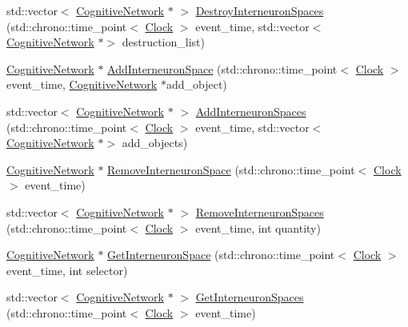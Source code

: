 \begin{DoxyCompactItemize}
\item 
std\+::vector$<$ \mbox{\hyperlink{class_cognitive_network}{Cognitive\+Network}} $\ast$ $>$ \mbox{\hyperlink{class_cognitive_network_a718833496332e0471186c9a886005c4a}{Destroy\+Interneuron\+Spaces}} (std\+::chrono\+::time\+\_\+point$<$ \mbox{\hyperlink{universe_8h_a0ef8d951d1ca5ab3cfaf7ab4c7a6fd80}{Clock}} $>$ event\+\_\+time, std\+::vector$<$ \mbox{\hyperlink{class_cognitive_network}{Cognitive\+Network}} $\ast$$>$ destruction\+\_\+list)
\item 
\mbox{\hyperlink{class_cognitive_network}{Cognitive\+Network}} $\ast$ \mbox{\hyperlink{class_cognitive_network_ac6a7e01f097d0cb6434eb8fa7640c214}{Add\+Interneuron\+Space}} (std\+::chrono\+::time\+\_\+point$<$ \mbox{\hyperlink{universe_8h_a0ef8d951d1ca5ab3cfaf7ab4c7a6fd80}{Clock}} $>$ event\+\_\+time, \mbox{\hyperlink{class_cognitive_network}{Cognitive\+Network}} $\ast$add\+\_\+object)
\item 
std\+::vector$<$ \mbox{\hyperlink{class_cognitive_network}{Cognitive\+Network}} $\ast$ $>$ \mbox{\hyperlink{class_cognitive_network_aeafe16b9f44ae1316c072a85e726ee83}{Add\+Interneuron\+Spaces}} (std\+::chrono\+::time\+\_\+point$<$ \mbox{\hyperlink{universe_8h_a0ef8d951d1ca5ab3cfaf7ab4c7a6fd80}{Clock}} $>$ event\+\_\+time, std\+::vector$<$ \mbox{\hyperlink{class_cognitive_network}{Cognitive\+Network}} $\ast$$>$ add\+\_\+objects)
\item 
\mbox{\hyperlink{class_cognitive_network}{Cognitive\+Network}} $\ast$ \mbox{\hyperlink{class_cognitive_network_a04e38cea356f1c7ac31c4df5e19d759c}{Remove\+Interneuron\+Space}} (std\+::chrono\+::time\+\_\+point$<$ \mbox{\hyperlink{universe_8h_a0ef8d951d1ca5ab3cfaf7ab4c7a6fd80}{Clock}} $>$ event\+\_\+time)
\item 
std\+::vector$<$ \mbox{\hyperlink{class_cognitive_network}{Cognitive\+Network}} $\ast$ $>$ \mbox{\hyperlink{class_cognitive_network_a994c5f93447a82429809c89aa08d3dc1}{Remove\+Interneuron\+Spaces}} (std\+::chrono\+::time\+\_\+point$<$ \mbox{\hyperlink{universe_8h_a0ef8d951d1ca5ab3cfaf7ab4c7a6fd80}{Clock}} $>$ event\+\_\+time, int quantity)
\item 
\mbox{\hyperlink{class_cognitive_network}{Cognitive\+Network}} $\ast$ \mbox{\hyperlink{class_cognitive_network_a0119d61e86ea6b84ad7f69f88d59d008}{Get\+Interneuron\+Space}} (std\+::chrono\+::time\+\_\+point$<$ \mbox{\hyperlink{universe_8h_a0ef8d951d1ca5ab3cfaf7ab4c7a6fd80}{Clock}} $>$ event\+\_\+time, int selector)
\item 
std\+::vector$<$ \mbox{\hyperlink{class_cognitive_network}{Cognitive\+Network}} $\ast$ $>$ \mbox{\hyperlink{class_cognitive_network_a4daf966882d527b784bd359794ad39ca}{Get\+Interneuron\+Spaces}} (std\+::chrono\+::time\+\_\+point$<$ \mbox{\hyperlink{universe_8h_a0ef8d951d1ca5ab3cfaf7ab4c7a6fd80}{Clock}} $>$ event\+\_\+time)

\end{DoxyCompactItemize}
